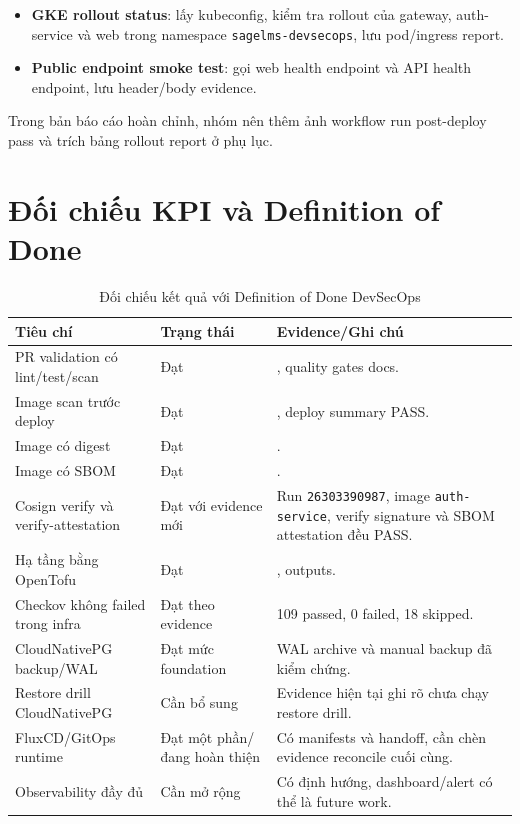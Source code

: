 \begin{itemize}
  \item \textbf{GKE rollout status}: lấy kubeconfig, kiểm tra rollout của gateway, auth-service và web trong namespace \texttt{sagelms-devsecops}, lưu pod/ingress report.
  \item \textbf{Public endpoint smoke test}: gọi web health endpoint và API health endpoint, lưu header/body evidence.
\end{itemize}

Trong bản báo cáo hoàn chỉnh, nhóm nên thêm ảnh workflow run post-deploy pass và trích bảng rollout report ở phụ lục.

\section{Đối chiếu KPI và Definition of Done}

\begin{table}[H]
\centering
\caption{Đối chiếu kết quả với Definition of Done DevSecOps}
\label{tab:dod-evaluation}
\begin{tabularx}{\textwidth}{p{}p{}Y}
\toprule
\textbf{Tiêu chí} & \textbf{Trạng thái} & \textbf{Evidence/Ghi chú} \\
\midrule
PR validation có lint/test/scan & Đạt & , quality gates docs. \\
Image scan trước deploy & Đạt & , deploy summary PASS. \\
Image có digest & Đạt & . \\
Image có SBOM & Đạt & . \\
Cosign verify và verify-attestation & Đạt với evidence mới & Run \texttt{26303390987}, image \texttt{auth-service}, verify signature và SBOM attestation đều PASS. \\
Hạ tầng bằng OpenTofu & Đạt & , outputs. \\
Checkov không failed trong infra & Đạt theo evidence & 109 passed, 0 failed, 18 skipped. \\
CloudNativePG backup/WAL & Đạt mức foundation & WAL archive và manual backup đã kiểm chứng. \\
Restore drill CloudNativePG & Cần bổ sung & Evidence hiện tại ghi rõ chưa chạy restore drill. \\
FluxCD/GitOps runtime & Đạt một phần/đang hoàn thiện & Có manifests và handoff, cần chèn evidence reconcile cuối cùng. \\
Observability đầy đủ & Cần mở rộng & Có định hướng, dashboard/alert có thể là future work. \\
\bottomrule
\end{tabularx}
\end{table}
